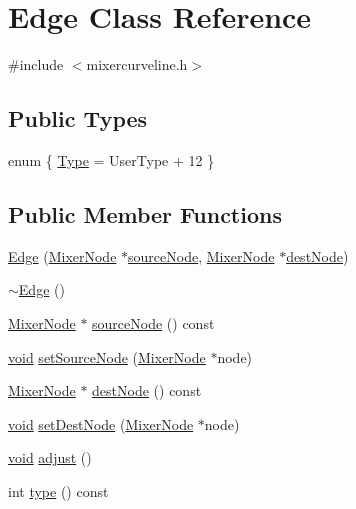 \hypertarget{class_edge}{\section{\-Edge \-Class \-Reference}
\label{class_edge}
}


{\ttfamily \#include $<$mixercurveline.\-h$>$}

\subsection*{\-Public \-Types}
\begin{DoxyCompactItemize}
\item 
enum \{ \hyperlink{group___u_a_v_object_widget_utils_ggaa1ed12ae47b3b5c3b75c99c63986575da59a3ef5ffd963601ffda52bb7bf42b3c}{\-Type} =  \-User\-Type + 12
 \}
\end{DoxyCompactItemize}
\subsection*{\-Public \-Member \-Functions}
\begin{DoxyCompactItemize}
\item 
\hyperlink{group___u_a_v_object_widget_utils_gaaaf462ed746395725efc1ecc8ea00ec4}{\-Edge} (\hyperlink{class_mixer_node}{\-Mixer\-Node} $\ast$\hyperlink{group___u_a_v_object_widget_utils_ga9d06da5f40991dc21459764c5e3783b1}{source\-Node}, \hyperlink{class_mixer_node}{\-Mixer\-Node} $\ast$\hyperlink{group___u_a_v_object_widget_utils_ga63800818ac0cf98ea9cff4ba44532c4d}{dest\-Node})
\item 
\hyperlink{group___u_a_v_object_widget_utils_ga2f37b72f044427961d6730943daf10e0}{$\sim$\-Edge} ()
\item 
\hyperlink{class_mixer_node}{\-Mixer\-Node} $\ast$ \hyperlink{group___u_a_v_object_widget_utils_ga9d06da5f40991dc21459764c5e3783b1}{source\-Node} () const 
\item 
\hyperlink{group___u_a_v_objects_plugin_ga444cf2ff3f0ecbe028adce838d373f5c}{void} \hyperlink{group___u_a_v_object_widget_utils_gacc2025ad40fdd1225c77d3814bd356d2}{set\-Source\-Node} (\hyperlink{class_mixer_node}{\-Mixer\-Node} $\ast$node)
\item 
\hyperlink{class_mixer_node}{\-Mixer\-Node} $\ast$ \hyperlink{group___u_a_v_object_widget_utils_ga63800818ac0cf98ea9cff4ba44532c4d}{dest\-Node} () const 
\item 
\hyperlink{group___u_a_v_objects_plugin_ga444cf2ff3f0ecbe028adce838d373f5c}{void} \hyperlink{group___u_a_v_object_widget_utils_gac291239456c76a2347f0d94e1aa8b14c}{set\-Dest\-Node} (\hyperlink{class_mixer_node}{\-Mixer\-Node} $\ast$node)
\item 
\hyperlink{group___u_a_v_objects_plugin_ga444cf2ff3f0ecbe028adce838d373f5c}{void} \hyperlink{group___u_a_v_object_widget_utils_gab554a765fd7a57fcdf289aa51b4df328}{adjust} ()
\item 
int \hyperlink{group___u_a_v_object_widget_utils_ga8ad60980ad4024691e462442f64eb7d2}{type} () const 
\end{DoxyCompactItemize}
